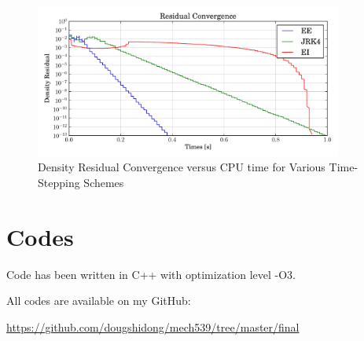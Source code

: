\documentclass[letterpaper,12pt,]{article}
\begin{document}
\begin{figure}[!ht]
    \centering
    \includegraphics[width = 0.9\textwidth]{./figures/q5t.pdf}
    \caption {Density Residual Convergence versus CPU time for Various Time-Stepping Schemes}
    \label{fig:q5t}
\end{figure}

\section*{Codes}

Code has been written in C++ with optimization level -O3.

All codes are available on my GitHub:

\url{https://github.com/dougshidong/mech539/tree/master/final}
\end{document}
